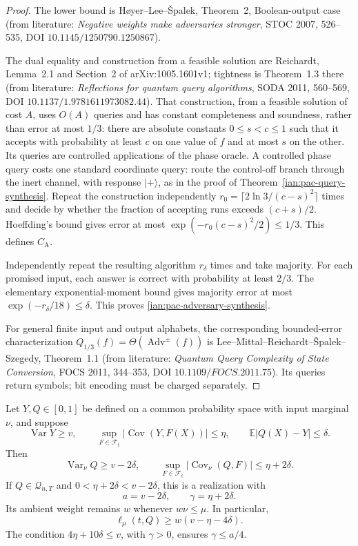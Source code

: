 \begin{proof}
The lower bound is H{\o}yer--Lee--{\v S}palek, Theorem~2,
Boolean-output case (from literature:
\emph{Negative weights make adversaries stronger},
STOC 2007, 526--535, DOI \(10.1145/1250790.1250867\)).

The dual equality and construction from a feasible solution are
Reichardt, Lemma~2.1 and Section~2 of arXiv:1005.1601v1;
tightness is Theorem~1.3 there (from literature:
\emph{Reflections for quantum query algorithms},
SODA 2011, 560--569, DOI \(10.1137/1.9781611973082.44\)).
That construction, from a feasible solution of cost \(A\), uses \(O(A)\) queries and has constant completeness and soundness, rather than error at most \(1/3\): there are absolute constants \(0\le s<c\le1\) such that it accepts with probability at least \(c\) on one value of \(f\) and at most \(s\) on the other.
Its queries are controlled applications of the phase oracle. A controlled phase query costs one standard coordinate query: route the control-off branch through the inert channel, with response \(|+\rangle\), as in the proof of Theorem~\ref{ian:pac-query-synthesis}.
Repeat the construction independently
\(r_0=\lceil2\ln3/(c-s)^2\rceil\) times and decide by whether the fraction of accepting runs exceeds \((c+s)/2\). Hoeffding's bound gives error at most \(\exp(-r_0(c-s)^2/2)\le1/3\). This defines \(C_{\mathrm A}\).

Independently repeat the resulting algorithm \(r_\delta\) times
and take majority. For each promised input, each answer is correct
with probability at least \(2/3\). The elementary exponential-moment
bound gives majority error at most
\(\exp(-r_\delta/18)\le\delta\).
This proves \eqref{ian:pac-adversary-synthesis}.

For general finite input and output alphabets, the corresponding
bounded-error characterization
\(Q_{1/3}(f)=\Theta(\operatorname{Adv}^{\pm}(f))\)
is Lee--Mittal--Reichardt--{\v S}palek--Szegedy,
Theorem~1.1 (from literature:
\emph{Quantum Query Complexity of State Conversion},
FOCS 2011, 344--353, DOI \(10.1109/FOCS.2011.75\)).
Its queries return symbols; bit encoding must be charged separately.
\end{proof}

\begin{lemma}
\label{ian:pac-robust-compilation}
Let \(Y,Q\in[0,1]\) be defined on a common probability space with
input marginal \(\nu\), and suppose
\[
 \operatorname{Var}Y\ge v,\qquad
 \sup_{F\in\mathcal F_t}|\operatorname{Cov}(Y,F(X))|\le\eta,
 \qquad
 \mathbb E|Q(X)-Y|\le\delta.
\]
Then
\[
 \operatorname{Var}_\nu Q\ge v-2\delta,\qquad
 \sup_{F\in\mathcal F_t}
       |\operatorname{Cov}_\nu(Q,F)|\le\eta+2\delta.
 \tag{32.13}\label{ian:pac-compilation}
\]
If \(Q\in\mathcal Q_{n,T}\) and
\(0<\eta+2\delta<v-2\delta\), this is a realization with
\[
 a=v-2\delta,\qquad \gamma=\eta+2\delta.
\]
Its ambient weight remains \(w\) whenever \(w\nu\le\mu\).
In particular,
\[
 \ell_\mu(t,Q)\ge w(v-\eta-4\delta).
\]
The condition \(4\eta+10\delta\le v\), with \(\gamma>0\),
ensures \(\gamma\le a/4\).
\end{lemma}

